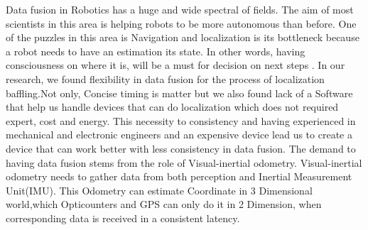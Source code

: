 \documentclass[a4paper,twoside]{article}
\begin{document}
Data fusion  in Robotics has a huge and wide spectral of fields. The aim of most scientists in this area is helping robots to be more autonomous than before. One of the puzzles in this area is Navigation and localization is its bottleneck because a robot needs to have an estimation its state. In other words, having consciousness on where it is, will be a must for decision on next steps .
In our research, we found flexibility in data fusion for the process of localization baffling.Not only, Concise timing is matter but we also found lack of a Software that help us handle devices that can do localization which does not required expert, cost and energy. This necessity to consistency and having experienced in mechanical and electronic engineers and an expensive device lead us to create a device that can work better with less consistency in data fusion.
The demand to having data fusion stems from the role of Visual-inertial odometry. Visual-inertial odometry needs to gather data from both perception and Inertial Measurement Unit(IMU). This Odometry can estimate Coordinate in 3 Dimensional world,which Opticounters and GPS can only do it in 2 Dimension, when corresponding data is received in a consistent latency.   
\end{document}
